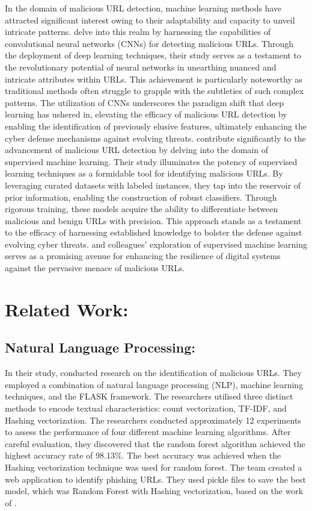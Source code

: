 In the domain of malicious URL detection, machine learning methods have attracted significant interest owing to their adaptability and capacity to unveil intricate patterns.\cite{abdi2017malicious} delve into this realm by harnessing the capabilities of convolutional neural networks (CNNs) for detecting malicious URLs. Through the deployment of deep learning techniques, their study serves as a testament to the revolutionary potential of neural networks in unearthing nuanced and intricate attributes within URLs. This achievement is particularly noteworthy as traditional methods often struggle to grapple with the subtleties of such complex patterns. The utilization of CNNs underscores the paradigm shift that deep learning has ushered in, elevating the efficacy of malicious URL detection by enabling the identification of previously elusive features, ultimately enhancing the cyber defense mechanisms against evolving threats.
 \cite{vundavalli2020malicious} contribute significantly to the advancement of malicious URL detection by delving into the domain of supervised machine learning. Their study illuminates the potency of supervised learning techniques as a formidable tool for identifying malicious URLs. By leveraging curated datasets with labeled instances, they tap into the reservoir of prior information, enabling the construction of robust classifiers. Through rigorous training, these models acquire the ability to differentiate between malicious and benign URLs with precision. This approach stands as a testament to the efficacy of harnessing established knowledge to bolster the defense against evolving cyber threats.\cite{vundavalli2020malicious} and colleagues' exploration of supervised machine learning serves as a promising avenue for enhancing the resilience of digital systems against the pervasive menace of malicious URLs.


\section{Related Work:}
\subsection{Natural Language Processing:}
In their study,\cite{Joshi} conducted research on the identification of malicious URLs. They employed a combination of natural language processing (NLP), machine learning techniques, and the FLASK framework. The researchers utilised three distinct methods to encode textual characteristics: count vectorization, TF-IDF, and Hashing vectorization. The researchers conducted approximately 12 experiments to assess the performance of four different machine learning algorithms. After careful evaluation, they discovered that the random forest algorithm achieved the highest accuracy rate of 98.13\%. The best accuracy was achieved when the Hashing vectorization technique was used for random forest. The team created a web application to identify phishing URLs. They used pickle files to save the best model, which was Random Forest with Hashing vectorization, based on the work of \cite{le2018urlnet}.


